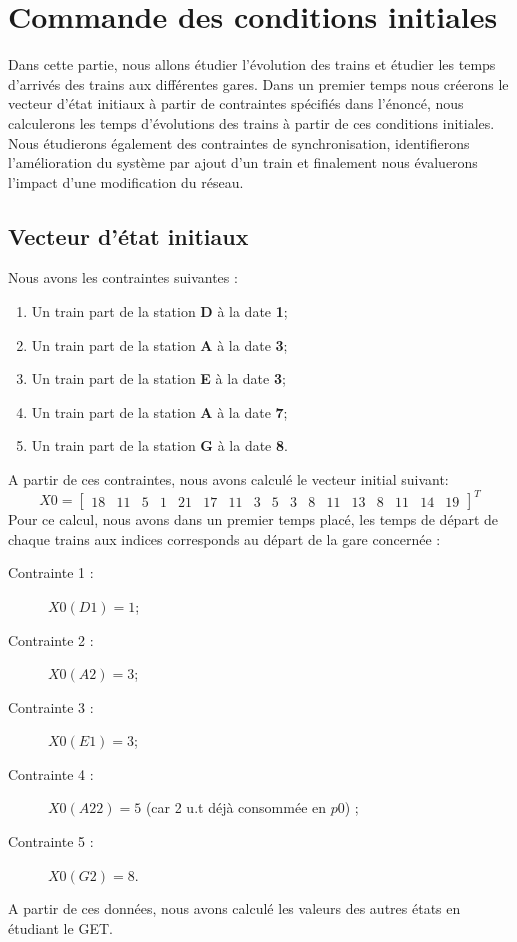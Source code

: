 \section{Commande des conditions initiales}
Dans cette partie, nous allons étudier l'évolution des trains et étudier les temps d'arrivés des trains aux différentes gares. 
Dans un premier temps nous créerons le vecteur d'état initiaux à partir de contraintes spécifiés dans l'énoncé, nous calculerons les temps d'évolutions des trains à partir de ces conditions initiales. Nous étudierons également des contraintes de synchronisation, identifierons l'amélioration du système par ajout d'un train et finalement nous évaluerons l'impact d'une modification du réseau.
\subsection{Vecteur d'état initiaux}
Nous avons les contraintes suivantes : 
\begin{enumerate}
\item Un train part de la station \textbf{D} à la date \textbf{1};%
\item Un train part de la station \textbf{A} à la date \textbf{3};%
\item Un train part de la station \textbf{E} à la date \textbf{3};%
\item Un train part de la station \textbf{A} à la date \textbf{7};%
\item Un train part de la station \textbf{G} à la date \textbf{8}.%
\end{enumerate}
A partir de ces contraintes, nous avons calculé le vecteur initial suivant: 
\begin{equation}
X0 = 
\left[
\begin{array}{ccccccccccccccccc}
18  &11  &5   &1   &21  &17  &11  &3   &5   &3   &8   &11  &13  &8   &11  &14  &19 
\end{array} \right]^T
\end{equation}
Pour ce calcul, nous avons dans un premier temps placé, les temps de départ de chaque trains aux indices corresponds au départ de la gare concernée : 
\begin{description}

\item[Contrainte 1 :] $X0(D1) = 1$; 
\item[Contrainte 2 :] $X0(A2) = 3$; 
\item[Contrainte 3 :] $X0(E1) = 3$; 
\item[Contrainte 4 :] $X0(A22) = 5$ (car 2 u.t déjà consommée en $p0$) ; 
\item[Contrainte 5 :] $X0(G2) = 8$. 
\end{description}
A partir de ces données, nous avons calculé les valeurs des autres états en étudiant le GET.


